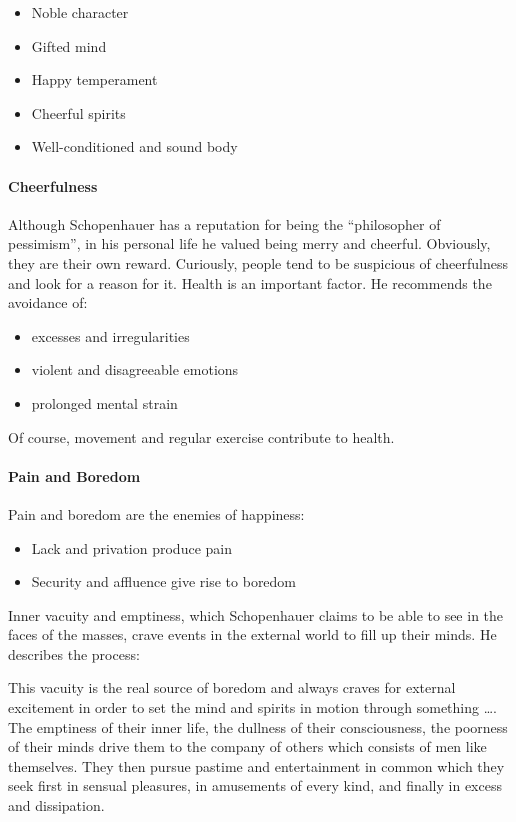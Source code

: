 \begin{itemize}
\item Noble character 
\item Gifted mind 
\item Happy temperament 
\item Cheerful spirits 
\item Well-conditioned and sound body 
\end{itemize}

\paragraph{Cheerfulness}
Although Schopenhauer has a reputation for being the “philosopher of pessimism”, in his personal life he valued being
merry and cheerful. Obviously, they are their own reward. Curiously, people tend to be suspicious of cheerfulness and
look for a reason for it. Health is an important factor. He recommends the avoidance of:

\begin{itemize}
\item excesses and irregularities 
\item violent and disagreeable emotions 
\item prolonged mental strain 
\end{itemize}

Of course, movement and regular exercise contribute to health.

\paragraph{Pain and Boredom}
Pain and boredom are the enemies of happiness:

\begin{itemize}
\item Lack and privation produce pain 
\item Security and affluence give rise to boredom 
\end{itemize}
Inner vacuity and emptiness, which Schopenhauer claims to be able to see in the faces of the masses, crave events in the
external world to fill up their minds. He describes the process:

\begin{quotex}
This vacuity is the real source of boredom and always craves for external excitement in order to set the mind and
spirits in motion through something …. The emptiness of their inner life, the dullness of their consciousness, the
poorness of their minds drive them to the company of others which consists of men like themselves. They then pursue
pastime and entertainment in common which they seek first in sensual pleasures, in amusements of every kind, and
finally in excess and dissipation. 

\end{quotex}

